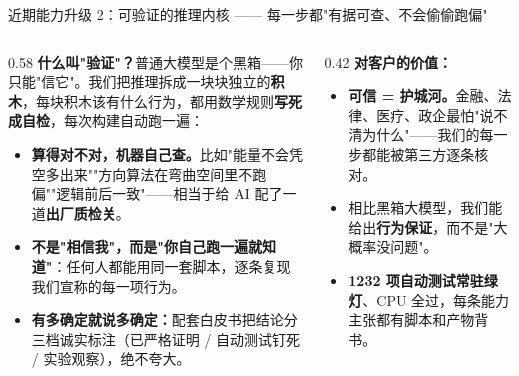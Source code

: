 ﻿\documentclass[aspectratio=169, 10pt]{beamer}
\begin{document}
\begin{frame}{近期能力升级 2：可验证的推理内核 —— 每一步都"有据可查、不会偷偷跑偏"}
\small
\begin{columns}
\begin{column}{0.58\textwidth}
\textbf{什么叫"验证"？}普通大模型是个黑箱——你只能"信它"。我们把推理拆成一块块独立的\textbf{积木}，每块积木该有什么行为，都用数学规则\textbf{写死成自检}，每次构建自动跑一遍：
\begin{itemize}\itemsep=0.3em
    \item \textbf{算得对不对，机器自己查。}比如"能量不会凭空多出来""方向算法在弯曲空间里不跑偏""逻辑前后一致"——相当于给 AI 配了一道\textbf{出厂质检关}。
    \item \textbf{不是"相信我"，而是"你自己跑一遍就知道"}：任何人都能用同一套脚本，逐条复现我们宣称的每一项行为。
    \item \textbf{有多确定就说多确定：}配套白皮书把结论分三档诚实标注（已严格证明 / 自动测试钉死 / 实验观察），绝不夸大。
\end{itemize}
\end{column}
\begin{column}{0.42\textwidth}
\textbf{对客户的价值：}
\begin{itemize}\itemsep=0.3em
    \item \textbf{可信 = 护城河。}金融、法律、医疗、政企最怕"说不清为什么"——我们的每一步都能被第三方逐条核对。
    \item 相比黑箱大模型，我们能给出\textbf{行为保证}，而不是"大概率没问题"。
    \item \textbf{1232 项自动测试常驻绿灯}、CPU 全过，每条能力主张都有脚本和产物背书。
\end{itemize}
\end{column}
\end{columns}
\end{frame}
\end{document}
